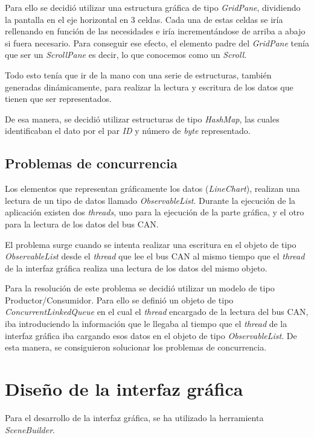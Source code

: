 Para ello se decidió utilizar una estructura gráfica de tipo \emph{GridPane}, dividiendo la pantalla en el eje horizontal en 3 celdas. Cada una de estas celdas se iría rellenando en función de las necesidades e iría incrementándose de arriba a abajo si fuera necesario. Para conseguir ese efecto, el elemento padre del \emph{GridPane} tenía que ser un \emph{ScrollPane} es decir, lo que conocemos como un \emph{Scroll}.

Todo esto tenía que ir de la mano con una serie de estructuras, también generadas dinámicamente, para realizar la lectura y escritura de los datos que tienen que ser representados.

De esa manera, se decidió utilizar estructuras de tipo \emph{HashMap}, las cuales identificaban el dato por el par \emph{ID} y número de \emph{byte} representado.

\subsection{Problemas de concurrencia}\label{problemas_de_concurrencia}

Los elementos que representan gráficamente los datos (\emph{LineChart}), realizan una lectura de un tipo de datos llamado \emph{ObservableList}. Durante la ejecución de la aplicación existen dos \emph{threads}, uno para la ejecución de la parte gráfica, y el otro para la lectura de los datos del bus CAN.

El problema surge cuando se intenta realizar una escritura en el objeto de tipo \emph{ObservableList} desde el \emph{thread} que lee el bus CAN al mismo tiempo que el \emph{thread} de la interfaz gráfica realiza una lectura de los datos del mismo objeto.

Para la resolución de este problema se decidió utilizar un modelo de tipo Productor/Consumidor. Para ello se definió un objeto de tipo \emph{ConcurrentLinkedQueue} en el cual el \emph{thread} encargado de la lectura del bus CAN, iba introduciendo la información que le llegaba al tiempo que el \emph{thread} de la interfaz gráfica iba cargando esos datos en el objeto de tipo \emph{ObservableList}. De esta manera, se consiguieron solucionar los problemas de concurrencia.

\section{Diseño de la interfaz gráfica}\label{diseño_de_la_interfaz_grafica}

Para el desarrollo de la interfaz gráfica, se ha utilizado la herramienta \emph{SceneBuilder}.

